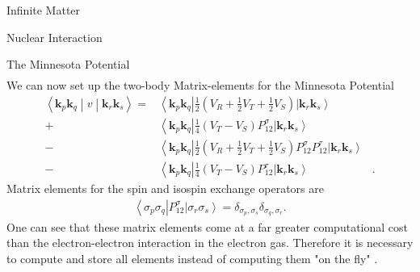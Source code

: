 \documentclass[twoside,english]{uiofysmaster}
\begin{document}
\begin{chapter}{Infinite Matter}
\begin{section}{Nuclear Interaction}
\begin{subsection}{The Minnesota Potential}
\begin{align}
			\end{align}
			We can now set up the two-body Matrix-elements for the Minnesota Potential
			\begin{align}
				\left<\mathbf{k}_p \mathbf{k}_q \middle| v \middle| \mathbf{k}_r \mathbf{k}_s \right> = 
				&\left<\mathbf{k}_p \mathbf{k}_q \right| \frac{1}{2} \left( V_R + \frac{1}{2} V_T + \frac{1}{2} V_S \right) \left| \mathbf{k}_r \mathbf{k}_s \right>   \\
				+&\left<\mathbf{k}_p \mathbf{k}_q \right| \frac{1}{4} (V_T - V_S) P_{12}^\sigma \left| \mathbf{k}_r \mathbf{k}_s \right> \nonumber \\
				-&\left<\mathbf{k}_p \mathbf{k}_q \right| \frac{1}{2} \left( V_R + \frac{1}{2} V_T + \frac{1}{2} V_S \right) P_{12}^\sigma P_{12}^\tau \left| \mathbf{k}_r \mathbf{k}_s \right> \nonumber \\
				-&\left<\mathbf{k}_p \mathbf{k}_q \right| \frac{1}{4}(V_T - V_S) P_{12}^\tau  \left| \mathbf{k}_r \mathbf{k}_s \right>&. \nonumber
			\end{align}
			Matrix elements for the spin and isospin exchange operators are 
			\begin{align}
				\left< \sigma_p \sigma_q \right| P_{12}^\sigma \left| \sigma_r \sigma_s \right> = \delta_{\sigma_p,\sigma_s} \delta_{\sigma_q,\sigma_r}.
			\end{align}
			One can see that these matrix elements come at
                        a far greater computational cost than the
                        electron-electron interaction in the electron
                        gas. Therefore it is necessary to compute and
                        store all elements instead of computing them
                        "on the fly" \cite{MHJonline}.
		\end{subsection}
		
	\end{section}

\end{chapter}
\end{document}
